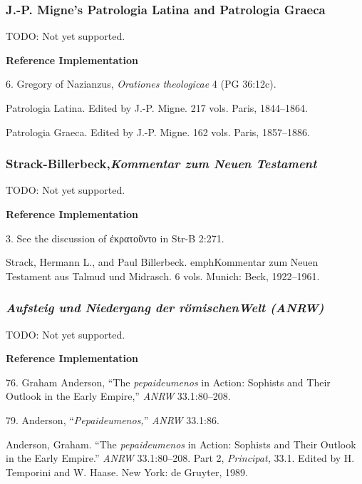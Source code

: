 \documentclass[a4paper]{article}
\newcommand{\gr}[1]{{\greekfont #1}}
\newenvironment{refimp}{%
  \begin{minipage}{\linewidth}
    \setlength{\parskip}{1ex}
    \textbf{Reference Implementation}\par
    \nobreak
    \color{reference-colour}
}{\end{minipage}}
\begin{document}
\subsubsection{J.-P. Migne's Patrologia Latina and Patrologia Graeca}

TODO: Not yet supported.

\begin{refimp}
  6. Gregory of Nazianzus, \emph{Orationes theologicae} 4 (PG 36:12c).

  \hangindent\bibindent Patrologia Latina. Edited by J.-P. Migne. 217 vols.
  Paris, 1844–1864.

  \hangindent\bibindent Patrologia Graeca. Edited by J.-P. Migne. 162 vols.
  Paris, 1857–1886.
\end{refimp}

\subsubsection{Strack-Billerbeck,\newline\emph{Kommentar zum Neuen Testament}}

TODO: Not yet supported.

\begin{refimp}
  3. See the discussion of \gr{ἐκρατοῦντο} in Str-B 2:271.

  \hangindent\bibindent Strack, Hermann L., and Paul Billerbeck.
  emph{Kommentar zum Neuen Testament aus Talmud und Midrasch.} 6 vols. Munich:
  Beck, 1922–1961.
\end{refimp}

\subsubsection{\emph{Aufsteig und Niedergang der römischen\newline Welt (ANRW)}}

TODO: Not yet supported.

\begin{refimp}
  76. Graham Anderson, “The \emph{pepaideumenos} in Action: Sophists and Their
  Outlook in the Early Empire,” \emph{ANRW} 33.1:80–208.

  79. Anderson, “\emph{Pepaideumenos,}” \emph{ANRW} 33.1:86.

  \hangindent\bibindent Anderson, Graham. “The \emph{pepaideumenos} in Action:
  Sophists and Their Outlook in the Early Empire.” \emph{ANRW} 33.1:80–208.
  Part 2, \emph{Principat,} 33.1. Edited by H. Temporini and W. Haase. New
  York: de Gruyter, 1989.
\end{refimp}
\end{document}
